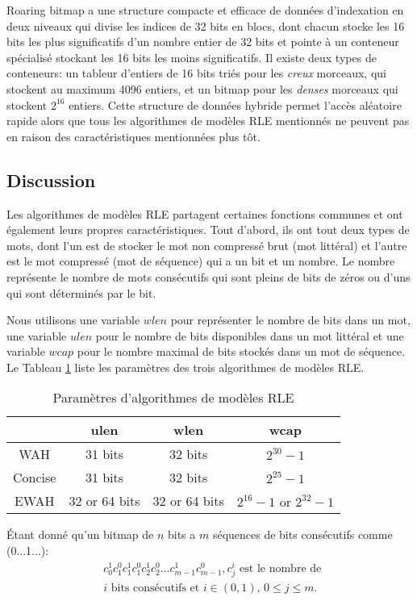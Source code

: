 Roaring bitmap a une structure compacte et efficace de données d'indexation en deux niveaux qui divise les indices de 32 bits en blocs, dont chacun stocke les 16 bits les plus significatifs d'un nombre entier de 32 bits et pointe à un conteneur spécialisé stockant les 16 bits les moins significatifs. Il existe deux types de conteneurs: un tableur d'entiers de 16 bits triés pour les \emph{creux} morceaux, qui stockent au maximum 4096 entiers, et un bitmap pour les \emph{denses} morceaux qui stockent $2^{16}$ entiers. Cette structure de données hybride permet l'accès aléatoire rapide alors que tous les algorithmes de modèles RLE mentionnés ne peuvent pas en raison des caractéristiques mentionnées plus tôt.

\subsection{Discussion}

Les algorithmes de modèles RLE partagent certaines fonctions communes et ont également leurs propres caractéristiques. Tout d'abord, ils ont tout deux types de mots, dont l'un est de stocker le mot non compressé brut (mot littéral) et l'autre est le mot compressé (mot de séquence) qui a un bit et un nombre. Le nombre représente le nombre de mots consécutifs qui sont pleins de bits de zéros ou d'uns qui sont déterminés par le bit.

Nous utilisons une variable $wlen$ pour représenter le nombre de bits dans un mot, une variable $ulen$ pour le nombre de bits disponibles dans un mot littéral et une variable $wcap$ pour le nombre maximal de bits stockés dans un mot de séquence. Le Tableau \ref{tbl:bm:bmparms} liste les paramètres des trois algorithmes de modèles RLE.

\begin{table}[h]
\centering
\begin{tabular}{|c|c|c|c|}
\hline
& ulen & wlen & wcap \\
\hline
WAH & 31 bits & 32 bits & $2^{30} - 1$ \\
\hline
Concise & 31 bits & 32 bits & $2^{25} - 1$ \\
\hline
EWAH & 32 or 64 bits & 32 or 64 bits & $2^{16} - 1 \text{ or } 2^{32} - 1$ \\
\hline
\end{tabular}
\caption{Paramètres d'algorithmes de modèles RLE}
\label{tbl:bm:bmparms}
\end{table}

Étant donné qu'un bitmap de $n$ bits a $m$ séquences de bits consécutifs comme (0...1...):
\begin{align*}
& c^1_0c^0_1c^1_1c^0_1c^1_2c^0_2...c^1_{m - 1}c^0_{m - 1}, c^i_j \text{ est le nombre de } \\
& i \text{ bits consécutifs et } i \in (0, 1),\, 0 \leq j \leq m.  
\end{align*}

